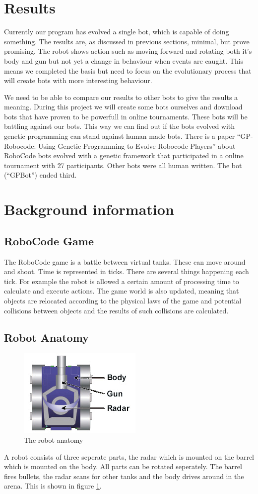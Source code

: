 \documentclass[a4paper,10pt]{article}
\begin{document}
\section{Results}
Currently our program has evolved a single bot, which is capable of doing something. The results are, as discussed in previous sections, minimal, but prove promising. The robot shows action such as moving forward and rotating both it's body and gun but not yet a change in behaviour when events are caught. This means we completed the basis but need to focus on the evolutionary process that will create bots with more interesting behaviour.

We need to be able to compare our results to other bots to give the results a meaning. During this project we will create some bots ourselves and download bots that have proven to be powerfull in online tournaments. These bots will be battling against our bots. This way we can find out if the bots evolved with genetic programming can stand against human made bots. There is a paper ``GP-Robocode: Using Genetic Programming to Evolve Robocode Players'' \cite{shichel} about RoboCode bots evolved with a genetic framework that participated in a online tournament with 27 participants. Other bots were all human written. The bot (``GPBot'') ended third.

\section{Background information}
\label{bi}
\subsection{RoboCode Game}
The RoboCode game is a battle between virtual tanks. These can move around and shoot. Time is represented in ticks. There are several things happening each tick. For example the robot is allowed a certain amount of processing time to calculate and execute actions. The game world is also updated, meaning that objects are relocated according to the physical laws of the game and potential collisions between objects and the results of such collisions are calculated.

\subsection{Robot Anatomy}
\begin{figure}
\label{anatomy}
\centering
\includegraphics[scale=1.5]{anatomy.jpg}
\caption{The robot anatomy}
\end{figure}
A robot consists of three seperate parts, the radar which is mounted on the barrel which is mounted on the body. All parts can be rotated seperately. The barrel fires bullets, the radar scans for other tanks and the body drives around in the arena. This is shown in figure \ref{anatomy}.
\end{document}
